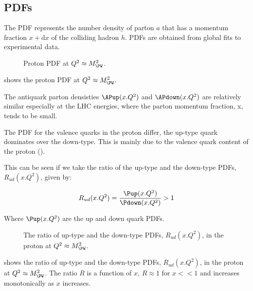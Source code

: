 
\subsection*{\acp{PDF}} 
The \ac{PDF} represents the number density of parton $a$ that has a momentum
fraction $x+\mathrm{d}x$ of the colliding hadron $h$.  \acp{PDF} are obtained
from global fits to experimental data. %

\begin{figure}[htb]
  \centering
  \caption{Proton PDF at $Q^2\approx M_{\PW}^2$.}
  \label{wbos:pdf}
\end{figure}

 shows the proton PDF at $Q^2\approx M_{\PW}^2$. 

The antiquark parton densisties $\APup(x.Q^2)$ and $\APdown(x.Q^2)$ are
relatively similar especially at the LHC energies, where the parton momentum
fraction, x, tends to be small.

The \ac{PDF} for the valence quarks in the proton differ, the up-type quark
dominates over the down-type. This is mainly due to the valence quark content
of the proton (\HepProcess{\Pup\Pup\Pdown}). 

This can be seen if we take the ratio of the up-type and the down-type \acp{PDF}, $R_{ud}(x.Q^2)$, given by:

\begin{equation}
  R_{ud}(x.Q^2) = \frac{\Pup(x.Q^2)}{ \Pdown(x.Q^2)} > 1
\end{equation}

Where $\Pup(x.Q^2)$ are the up and down quark \acp{PDF}.
\begin{figure}[htb]
  \centering
  \caption{The ratio of up-type and the down-type \acp{PDF}, $R_{ud}(x.Q^2)$,
  in the proton at $Q^2\approx M_{\PW}^2$.}
  \label{wbos:pdfrat}
\end{figure}

 shows the ratio of up-type and the down-type \acp{PDF},
$R_{ud}(x.Q^2)$, in the proton at $Q^2\approx M_{\PW}^2$. 
The ratio $R$ is a function of $x$, $R \approx 1$ for $x<<1$ and increases
monotonically as $x$ increases.  

